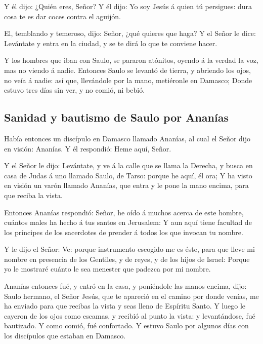  Y él dijo: ¿Quién eres, Señor? Y él dijo: Yo soy Jesús á
quien tú persigues: dura cosa te es dar coces contra el aguijón.

 El, temblando y temeroso, dijo: Señor, ¿qué quieres que
haga? Y el Señor le dice: Levántate y entra en la ciudad, y se te dirá
lo que te conviene hacer.

 Y los hombres que iban con Saulo, se pararon atónitos,
oyendo á la verdad la voz, mas no viendo á nadie.  Entonces
Saulo se levantó de tierra, y abriendo los ojos, no veía á nadie: así
que, llevándole por la mano, metiéronle en Damasco;  Donde
estuvo tres días sin ver, y no comió, ni bebió.

\hypertarget{sanidad-y-bautismo-de-saulo-por-ananuxedas}{%
\subsection{Sanidad y bautismo de Saulo por
Ananías}\label{sanidad-y-bautismo-de-saulo-por-ananuxedas}}

 Había entonces un discípulo en Damasco llamado Ananías, al
cual el Señor dijo en visión: Ananías. Y él respondió: Heme aquí, Señor.

 Y el Señor le dijo: Levántate, y ve á la calle que se
llama la Derecha, y busca en casa de Judas á uno llamado Saulo, de
Tarso: porque he aquí, él ora;  Y ha visto en visión un
varón llamado Ananías, que entra y le pone la mano encima, para que
reciba la vista.

 Entonces Ananías respondió: Señor, he oído á muchos acerca
de este hombre, cuántos males ha hecho á tus santos en Jerusalem:
 Y aun aquí tiene facultad de los príncipes de los
sacerdotes de prender á todos los que invocan tu nombre.

 Y le dijo el Señor: Ve: porque instrumento escogido me es
éste, para que lleve mi nombre en presencia de los Gentiles, y de reyes,
y de los hijos de Israel:  Porque yo le mostraré cuánto le
sea menester que padezca por mi nombre.

 Ananías entonces fué, y entró en la casa, y poniéndole las
manos encima, dijo: Saulo hermano, el Señor Jesús, que te apareció en el
camino por donde venías, me ha enviado para que recibas la vista y seas
lleno de Espíritu Santo.  Y luego le cayeron de los ojos
como escamas, y recibió al punto la vista: y levantándose, fué
bautizado.  Y como comió, fué confortado. Y estuvo Saulo
por algunos días con los discípulos que estaban en Damasco.

